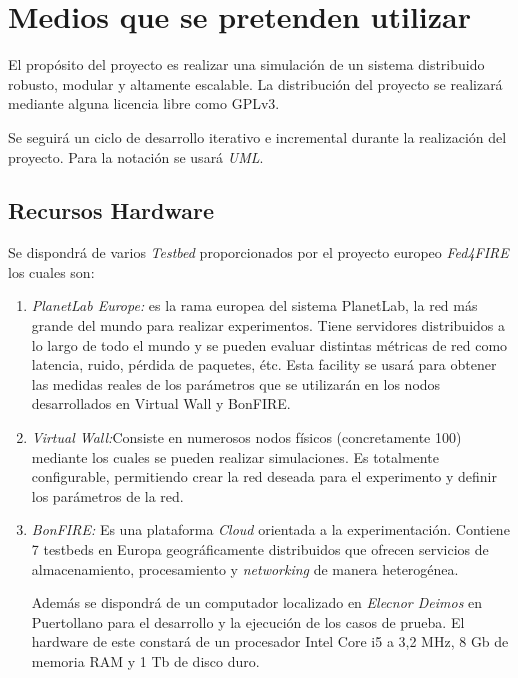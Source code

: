 
\section{Medios que se pretenden utilizar}
\label{sec:medios}

El propósito del proyecto es realizar una simulación de un sistema distribuido robusto, modular y altamente escalable.
La distribución del proyecto se realizará mediante alguna licencia libre como GPLv3\cite{GPLv3}.

Se seguirá un ciclo de desarrollo iterativo e incremental durante la realización del proyecto.
Para la notación se usará \emph{UML}\cite{UML}.

\subsection{Recursos Hardware}
\label{sec:hardware}
Se dispondrá de varios \emph{Testbed} proporcionados por el proyecto europeo \emph{Fed4FIRE} los cuales son:
\begin{enumerate}
\item \emph{PlanetLab Europe\cite{PLE}:} es la rama europea del sistema PlanetLab, la red más grande del mundo para realizar experimentos. Tiene servidores distribuidos a lo largo de todo el mundo y se pueden evaluar distintas métricas de red como latencia, ruido, pérdida de paquetes, étc. Esta facility se usará para obtener las medidas reales de los parámetros que se utilizarán en los nodos desarrollados en Virtual Wall y BonFIRE.

\item \emph{Virtual Wall\cite{VW}:}Consiste en numerosos nodos físicos (concretamente 100) mediante los cuales se pueden realizar simulaciones. Es totalmente configurable, permitiendo crear la red deseada para el experimento y definir los parámetros de la red.
\item \emph{BonFIRE\cite{BF}:} Es una plataforma \emph{Cloud} orientada a la experimentación. Contiene 7 testbeds en Europa geográficamente distribuidos que ofrecen servicios de almacenamiento, procesamiento y \emph{networking} de manera heterogénea.

Además se dispondrá de un computador localizado en \emph{Elecnor Deimos} en Puertollano para el desarrollo y la ejecución de los casos de prueba. El hardware de este constará de un procesador Intel Core i5 a 3,2 MHz, 8 Gb de memoria RAM y 1 Tb de disco duro.

\end{enumerate}

